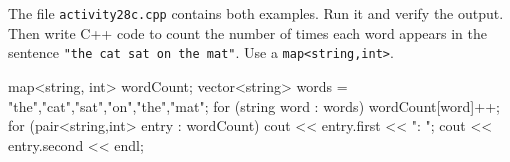   \vskip -20pt

  \Q The file {\tt activity28c.cpp} contains both examples.  Run it
    and verify the output.  Then write C++ code to count the number
    of times each word appears in the sentence {\tt "the cat sat on
    the mat"}.  Use a {\tt map<string,int>}.
    \begin{answer}[1.05in]
      \begin{cpplst}
map<string, int> wordCount;
vector<string> words =
    {"the","cat","sat","on","the","mat"};
for (string word : words) {
    wordCount[word]++;
}
for (pair<string,int> entry : wordCount) {
    cout << entry.first << ": ";
    cout << entry.second << endl;
}
      \end{cpplst}
    \end{answer}
